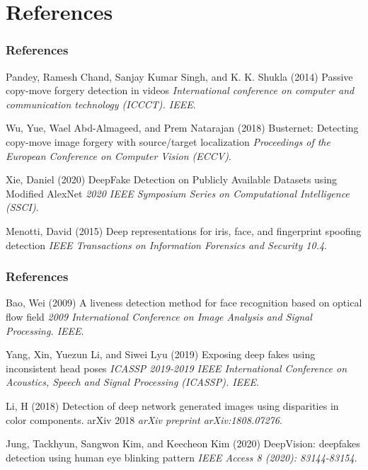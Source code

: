 \documentclass{beamer}
\begin{document}
\section{References}
\begin{frame}
\frametitle{References}
\footnotesize{
\begin{thebibliography}{99} %
 Pandey, Ramesh Chand, Sanjay Kumar Singh, and K. K. Shukla (2014)
\newblock Passive copy-move forgery detection in videos
\newblock \emph{International conference on computer and communication technology (ICCCT). IEEE}.

 Wu, Yue, Wael Abd-Almageed, and Prem Natarajan (2018)
\newblock Busternet: Detecting copy-move image forgery with source/target localization
\newblock \emph{Proceedings of the European Conference on Computer Vision (ECCV)}.

Xie, Daniel (2020)
\newblock DeepFake Detection on Publicly Available Datasets using Modified AlexNet
\newblock \emph{2020 IEEE Symposium Series on Computational Intelligence (SSCI)}.

Menotti, David (2015)
\newblock Deep representations for iris, face, and fingerprint spoofing detection
\newblock \emph{IEEE Transactions on Information Forensics and Security 10.4}.
\end{thebibliography}
}
\end{frame}


\begin{frame}
	\frametitle{References}
	\footnotesize{
		\begin{thebibliography}{99} %
			 Bao, Wei (2009)
			\newblock A liveness detection method for face recognition based on optical flow field
			\newblock \emph{2009 International Conference on Image Analysis and Signal Processing. IEEE}.
			
			 Yang, Xin, Yuezun Li, and Siwei Lyu (2019)
			\newblock Exposing deep fakes using inconsistent head poses
			\newblock \emph{ICASSP 2019-2019 IEEE International Conference on Acoustics, Speech and Signal Processing (ICASSP). IEEE}.
			
			Li, H (2018)
			\newblock Detection of deep network generated images using disparities in color components. arXiv 2018
			\newblock \emph{arXiv preprint arXiv:1808.07276}.
			
			Jung, Tackhyun, Sangwon Kim, and Keecheon Kim (2020)
			\newblock DeepVision: deepfakes detection using human eye blinking pattern
			\newblock \emph{IEEE Access 8 (2020): 83144-83154}.
		\end{thebibliography}
	}
\end{frame}
\end{document}
